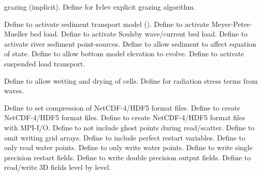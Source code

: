 \begin{klist}
\begin{klist}
\begin{klist}
       grazing (implicit).
        Define for Ivlev explicit grazing
       algorithm.
    \end{klist}
  \end{klist}
   \mbox{}
  \begin{klist}
     Define to activate sediment transport model
    (\cite{Warner_2008}).
     Define to activate Meyer-Peter-Mueller bed load.
     Define to activate Soulsby wave/current
    bed load.
     Define to activate river sediment
    point-sources.
     Define to allow sediment to affect equation of
    state.
     Define to allow bottom model elevation to evolve.
     Define to activate suspended load transport.
  \end{klist}
   \mbox{}
  \begin{klist}
     Define to allow wetting and drying of cells.
     Define for radiation stress terms from
    waves.
  \end{klist}
   \mbox{}
  \begin{klist}
     Define to set compression of NetCDF-4/HDF5 format files.
     Define to create NetCDF-4/HDF5 format files.
     Define to create NetCDF-4/HDF5 format files
    with MPI-I/O.
     Define to not include ghost points during
    read/scatter.
     Define to omit writing grid arrays.
     Define to include perfect restart variables.
     Define to only read water points.
     Define to only write water points.
     Define to write single precision restart fields.
     Define to write double precision output fields.
     Define to read/write 3D fields level by level.
  \end{klist}
\end{klist}

